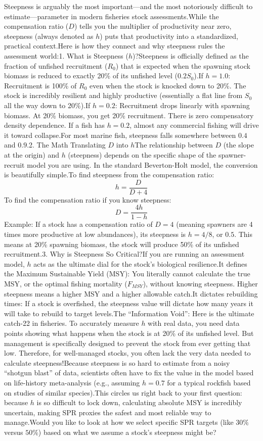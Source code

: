 \documentclass[
  authoryear,
  preprint,
  3p]{elsarticle}
\begin{document}
Steepness is arguably the most important---and the most notoriously
difficult to estimate---parameter in modern fisheries stock
assessments.While the compensation ratio (\(D\)) tells you the
multiplier of productivity near zero, steepness (always denoted as
\(h\)) puts that productivity into a standardized, practical
context.Here is how they connect and why steepness rules the assessment
world:1. What is Steepness (\(h\))?Steepness is officially defined as
the fraction of unfished recruitment (\(R_0\)) that is expected when the
spawning stock biomass is reduced to exactly 20\% of its unfished level
(\(0.2 S_0\)).If \(h = 1.0\): Recruitment is 100\% of \(R_0\) even when
the stock is knocked down to 20\%. The stock is incredibly resilient and
highly productive (essentially a flat line from \(S_0\) all the way down
to 20\%).If \(h = 0.2\): Recruitment drops linearly with spawning
biomass. At 20\% biomass, you get 20\% recruitment. There is zero
compensatory density dependence. If a fish has \(h=0.2\), almost any
commercial fishing will drive it toward collapse.For most marine fish,
steepness falls somewhere between \(0.4\) and \(0.9\).2. The Math
Translating \(D\) into \(h\)The relationship between \(D\) (the slope at
the origin) and \(h\) (steepness) depends on the specific shape of the
spawner-recruit model you are using. In the standard Beverton-Holt
model, the conversion is beautifully simple.To find steepness from the
compensation ratio:\[h = \frac{D}{D + 4}\]To find the compensation ratio
if you know steepness:\[D = \frac{4h}{1 - h}\]Example: If a stock has a
compensation ratio of \(D=4\) (meaning spawners are 4 times more
productive at low abundances), its steepness is \(h = 4/8\), or \(0.5\).
This means at 20\% spawning biomass, the stock will produce 50\% of its
unfished recruitment.3. Why is Steepness So Critical?If you are running
an assessment model, \(h\) acts as the ultimate dial for the stock's
biological resilience.It defines the Maximum Sustainable Yield (MSY):
You literally cannot calculate the true MSY, or the optimal fishing
mortality (\(F_{MSY}\)), without knowing steepness. Higher steepness
means a higher MSY and a higher allowable catch.It dictates rebuilding
times: If a stock is overfished, the steepness value will dictate how
many years it will take to rebuild to target levels.The ``Information
Void'': Here is the ultimate catch-22 in fisheries. To accurately
measure \(h\) with real data, you need data points showing what happens
when the stock is at 20\% of its unfished level. But management is
specifically designed to prevent the stock from ever getting that low.
Therefore, for well-managed stocks, you often lack the very data needed
to calculate steepness!Because steepness is so hard to estimate from a
noisy ``shotgun blast'' of data, scientists often have to fix the value
in the model based on life-history meta-analysis (e.g., assuming
\(h=0.7\) for a typical rockfish based on studies of similar
species).This circles us right back to your first question: because
\(h\) is so difficult to lock down, calculating absolute MSY is
incredibly uncertain, making SPR proxies the safest and most reliable
way to manage.Would you like to look at how we select specific SPR
targets (like \(30\%\) versus \(50\%\)) based on what we assume a
stock's steepness might be?
\end{document}
